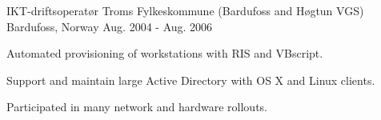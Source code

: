 \begin{cventries}
  \cventry
    {IKT-driftsoperatør} %
    {Troms Fylkeskommune (Bardufoss and Høgtun VGS)} %
    {Bardufoss, Norway} %
    {Aug. 2004 - Aug. 2006} %
    {
      \begin{cvitems} %
        \item {Automated provisioning of workstations with RIS and VBscript.}
        \item {Support and maintain large Active Directory with OS X and Linux clients.}
        \item {Participated in many network and hardware rollouts.}
      \end{cvitems}
    }
\end{cventries}
